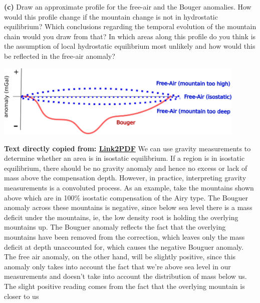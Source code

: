\documentclass[a4paper,12pt]{article}
\newif\ifanswers
\begin{document}
\textbf{(c)} Draw an approximate profile for the free-air and the Bouger anomalies. How would this profile change if the mountain change is not in hydrostatic equilibrium? Which conclusions regarding the temporal evolution of the mountain chain would you draw from that? In which areas along this profile do you think is the assumption of local hydrostatic equilibrium most unlikely and how would this be reflected in the free-air anomaly?
\ifanswers
  \begin{tcolorbox}[enhanced jigsaw,breakable,pad at break*=1mm,
    colback=blue!5!white,colframe=babyblueeyes,title=Solutions]
    \begin{center}
    \includegraphics[width=0.9\textwidth]{Figures/Gravimetry/SolutionsProfiles.png}
    \end{center}
    \textbf{Text directly copied from: \href{https://www.geology.cwu.edu/facstaff/tim/TEACHING/Geophysics/gravity_geoid.pdf}{Link2PDF}}
    We can use gravity measurements to determine whether an area is in isostatic equilibrium. If a region is in isostatic equilibrium, there should be no gravity anomaly and hence no excess or lack of mass above the compensation depth. However, in practice, interpreting gravity measurements is a convoluted process. As an example, take the mountains shown above which are in 100\% isostatic compensation of the Airy type. The Bouguer anomaly across these mountains is negative, since below sea level there is a mass deficit under the mountains, ie, the low density root is holding the overlying mountains up. The Bouguer
    anomaly reflects the fact that the overlying mountains have been removed from the correction, which leaves only the mass deficit at depth unaccounted for, which causes the negative Bouguer anomaly. The free air anomaly, on the other hand, will be slightly positive, since this anomaly only takes into account the fact that we’re above sea level in our measurements and doesn’t take into account the distribution of mass below us. The slight positive reading comes from the fact that the overlying mountain is closer to us

\end{tcolorbox}
\end{document}
